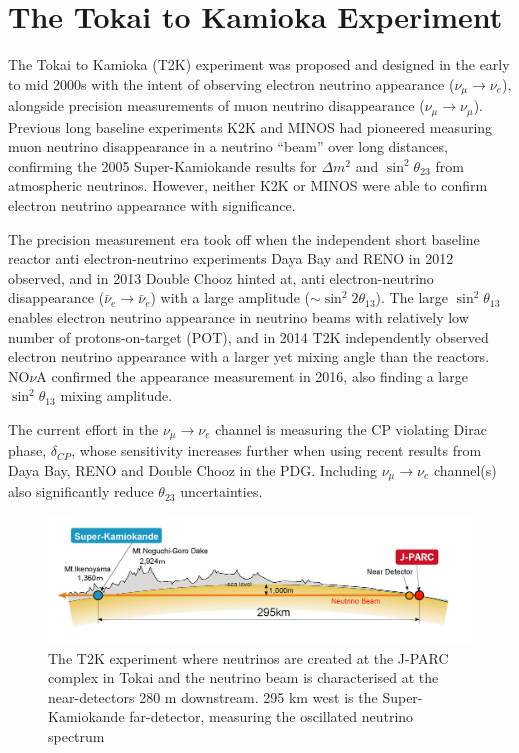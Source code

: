 \chapter{The Tokai to Kamioka Experiment}
\label{chap:detectors}
The Tokai to Kamioka (T2K) experiment was proposed and designed in the early to mid 2000s with the intent of observing electron neutrino appearance ($\nu_\mu \rightarrow \nu_e$), alongside precision measurements of muon neutrino disappearance ($\nu_\mu \rightarrow \nu_\mu$)\cite{t2k_loi,t2k_prop}. Previous long baseline experiments K2K\cite{k2k_obs} and MINOS\cite{minos_obs} had pioneered measuring muon neutrino disappearance in a neutrino ``beam'' over long distances, confirming the 2005 Super-Kamiokande results for $\Delta m^2$ and $\sin^2 \theta_{23}$ from atmospheric neutrinos\cite{sk_2005}. However, neither K2K or MINOS were able to confirm electron neutrino appearance with significance.

The precision measurement era took off when the independent short baseline reactor anti electron-neutrino experiments Daya Bay\cite{daya_bay_disc} and RENO\cite{reno_disc} in 2012 observed, and  in 2013 Double Chooz\cite{chooz_disc} hinted at, anti electron-neutrino disappearance ($\bar{\nu}_e \rightarrow \bar{\nu}_e$) with a large amplitude ($\sim \sin^2 2\theta_{13}$). The large $\sin^2 \theta_{13}$ enables electron neutrino appearance in neutrino beams with relatively low number of protons-on-target (POT), and in 2014 T2K independently observed electron neutrino appearance\cite{t2k_disc} with a larger yet mixing angle than the reactors. NO$\nu$A confirmed\cite{nova_disc} the appearance measurement in 2016, also finding a large $\sin^2 \theta_{13}$ mixing amplitude.

 The current effort in the $\nu_\mu \rightarrow \nu_e$ channel is measuring the CP violating Dirac phase, $\delta_{CP}$, whose sensitivity increases further when using recent results from Daya Bay\cite{daya_bay}, RENO\cite{reno} and Double Chooz\cite{double_chooz} in the PDG\cite{pdg_2017}. Including $\nu_\mu \rightarrow \nu_e$ channel(s) also significantly reduce $\theta_{23}$ uncertainties\cite{nova_neutrino2018}.
\begin{figure}[h]
	\includegraphics[width=1.0\textwidth, trim={0mm 0mm 0mm 0mm}, clip,page=1]{figures/det_chap/view/t2k_overview}
	\caption{The T2K experiment where neutrinos are created at the J-PARC complex in Tokai and the neutrino beam is characterised at the near-detectors 280 m downstream. 295 km west is the Super-Kamiokande far-detector, measuring the oscillated neutrino spectrum}
	\label{fig:t2k_overview}
\end{figure}

